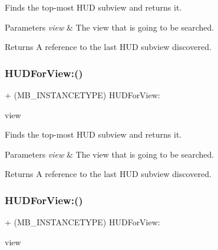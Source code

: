 Finds the top-\/most H\+UD subview and returns it.


\begin{DoxyParams}{Parameters}
{\em view} & The view that is going to be searched. \\
\hline
\end{DoxyParams}
\begin{DoxyReturn}{Returns}
A reference to the last H\+UD subview discovered. 
\end{DoxyReturn}
\mbox{\label{interface_m_b_progress_h_u_d_a30afd912f412c6612eee7f1e17241b5b}} 
\subsubsection{\texorpdfstring{H\+U\+D\+For\+View\+:()}{HUDForView:()}\hspace{0.1cm}{\footnotesize\ttfamily [2/3]}}
{\footnotesize\ttfamily + (M\+B\+\_\+\+I\+N\+S\+T\+A\+N\+C\+E\+T\+Y\+PE) H\+U\+D\+For\+View\+: \begin{DoxyParamCaption}\item[{(U\+I\+View $\ast$)}]{view }\end{DoxyParamCaption}}

Finds the top-\/most H\+UD subview and returns it.


\begin{DoxyParams}{Parameters}
{\em view} & The view that is going to be searched. \\
\hline
\end{DoxyParams}
\begin{DoxyReturn}{Returns}
A reference to the last H\+UD subview discovered. 
\end{DoxyReturn}
\mbox{\label{interface_m_b_progress_h_u_d_a30afd912f412c6612eee7f1e17241b5b}} 
\subsubsection{\texorpdfstring{H\+U\+D\+For\+View\+:()}{HUDForView:()}\hspace{0.1cm}{\footnotesize\ttfamily [3/3]}}
{\footnotesize\ttfamily + (M\+B\+\_\+\+I\+N\+S\+T\+A\+N\+C\+E\+T\+Y\+PE) H\+U\+D\+For\+View\+: \begin{DoxyParamCaption}\item[{(U\+I\+View $\ast$)}]{view }\end{DoxyParamCaption}}

